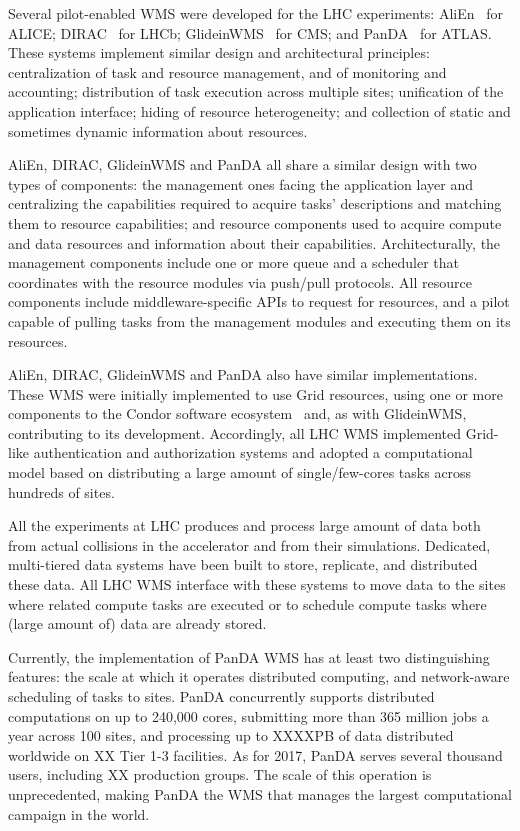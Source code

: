Several pilot-enabled WMS were developed for the LHC experiments:
AliEn~\cite{Bagnasco2010} for ALICE; DIRAC~\cite{Paterson2010} for LHCb;
GlideinWMS~\cite{sfiligoi2008glideinwms} for CMS; and
PanDA~\cite{maeno2014evolution} for ATLAS. These systems implement similar
design and architectural principles: centralization of task and resource
management, and of monitoring and accounting; distribution of task execution
across multiple sites; unification of the application interface; hiding of
resource heterogeneity; and collection of static and sometimes dynamic
information about resources.

AliEn, DIRAC, GlideinWMS and PanDA all share a similar design with two types of
components: the management ones facing the application layer and centralizing
the capabilities required to acquire tasks' descriptions and matching them to
resource capabilities; and resource components used to acquire compute and data
resources and information about their capabilities. Architecturally, the
management components include one or more queue and a scheduler that coordinates
with the resource modules via push/pull protocols. All resource components
include middleware-specific APIs to request for resources, and a pilot capable
of pulling tasks from the management modules and executing them on its
resources.

AliEn, DIRAC, GlideinWMS and PanDA also have similar implementations. These WMS
were initially implemented to use Grid resources, using one or more components
to the Condor software ecosystem~\cite{thain2005distributed} and, as with
GlideinWMS, contributing to its development. Accordingly, all LHC WMS
implemented Grid-like authentication and authorization systems and adopted a
computational model based on distributing a large amount of single/few-cores
tasks across hundreds of sites.

All the experiments at LHC produces and process large amount of data both from
actual collisions in the accelerator and from their simulations. Dedicated,
multi-tiered data systems have been built to store, replicate, and distributed
these data. All LHC WMS interface with these systems to move data to the sites
where related compute tasks are executed or to schedule compute tasks where
(large amount of) data are already stored.

Currently, the implementation of PanDA WMS has at least two distinguishing
features: the scale at which it operates distributed computing, and
network-aware scheduling of tasks to sites. PanDA concurrently supports distributed
computations on up to 240,000 cores, submitting more than 365 million jobs a
year across 100 sites, and processing up to XXXXPB of data distributed worldwide
on XX Tier 1-3 facilities. As for 2017, PanDA serves several thousand users,
including XX production groups. The scale of this operation is unprecedented,
making PanDA the WMS that manages the largest computational campaign in the
world.

